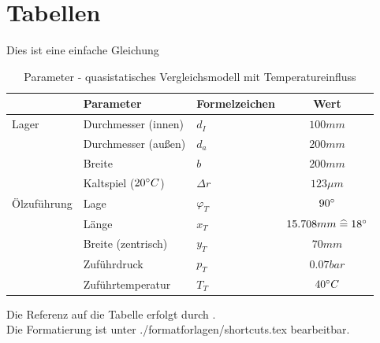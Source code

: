 %
\section{Tabellen}\label{sec:tabellen}
%
Dies ist eine einfache Gleichung

\begin{table}[h]
  \renewcommand{\arraystretch}{1.2} %
  \caption{Parameter - quasistatisches Vergleichsmodell mit Temperatureinfluss}
  \label{tab:einfache_tabelle}
  \vspace{0.5cm} 
  \begin{tabular}{|l|l|l|c|}
    \hline
                & \textbf{Parameter} & \textbf{Formelzeichen} & \textbf{Wert}\\
    \hline
    Lager         & Durchmesser (innen)         & $d_I$         & $100 mm$\\
                  & Durchmesser (außen)         & $d_a$         & $200 mm$\\
                  & Breite                      & $b$           & $200 mm$\\ 
                  & Kaltspiel ($20^\circ C$)     & $\Delta r$    & $123 \mu m$\\
    \hline
    Ölzuführung   & Lage                        & $\varphi_{T}$     & $90^\circ$\\
                  & Länge                       & $x_{T}$       & $15.708 mm \mathrel{\widehat{=}} 18^\circ$\\
                  & Breite (zentrisch)          & $y_{T}$       & $70 mm $\\
                  & Zuführdruck                 & $p_{T}$       & $0.07 bar$\\
                  & Zuführtemperatur            & $T_{T}$       & $40^\circ C$\\
  \hline
  \end{tabular}
  \renewcommand{\arraystretch}{1.0} %
\end{table}
%
Die Referenz auf die Tabelle erfolgt durch .\\
Die Formatierung ist unter ./formatforlagen/shortcuts.tex bearbeitbar.\\\\\\\\
